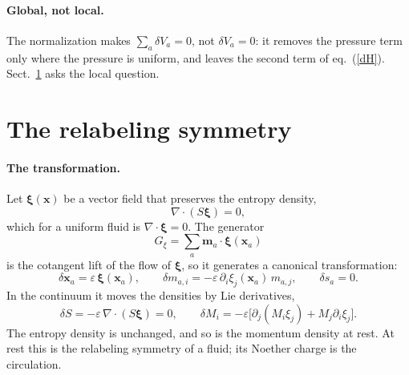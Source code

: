 \documentclass[11pt,aps,preprint,nofootinbib,superscriptaddress,tightenlines]{revtex4-2}
\def\st{\begin{equation}}
\def\stp{\end{equation}}
\def\Eq#1{eq.~(\ref{#1})}
\def\Sect#1{Sect.~\ref{#1}}
\let\oldparagraph\paragraph
\renewcommand{\paragraph}{\par\bigskip\oldparagraph}
\begin{document}
\paragraph{Global, not local.}  The normalization makes $\sum_a\delta V_a=0$, not
$\delta V_a=0$: it removes the pressure term only where the pressure is uniform, and leaves the
second term of \Eq{dH}.  \Sect{sec:relabel} asks the local question.

\section{The relabeling symmetry}
\label{sec:relabel}

\paragraph{The transformation.}  Let $\bm\xi(\bm x)$ be a vector field that preserves the
entropy density,
\st
\nabla\cdot(S\bm\xi)=0 ,
\stp
which for a uniform fluid is $\nabla\cdot\bm\xi=0$.  The generator
\st
G_\xi=\sum_a\bm m_a\cdot\bm\xi(\bm x_a)
\label{Gxi}
\stp
is the cotangent lift of the flow of $\bm\xi$, so it generates a canonical transformation:
\st
\delta\bm x_a=\varepsilon\,\bm\xi(\bm x_a),\qquad
\delta m_{a,i}=-\varepsilon\,\partial_i\xi_j(\bm x_a)\,m_{a,j},\qquad \delta s_a=0 .
\label{canxi}
\stp
In the continuum it moves the densities by Lie derivatives,
\st
\delta S=-\varepsilon\,\nabla\cdot(S\bm\xi)=0,\qquad
\delta M_i=-\varepsilon\big[\partial_j(M_i\xi_j)+M_j\partial_i\xi_j\big].
\label{dSdM}
\stp
The entropy density is unchanged, and so is the momentum density at rest.  At rest this is
the relabeling symmetry of a fluid; its Noether charge is the circulation.
\end{document}
